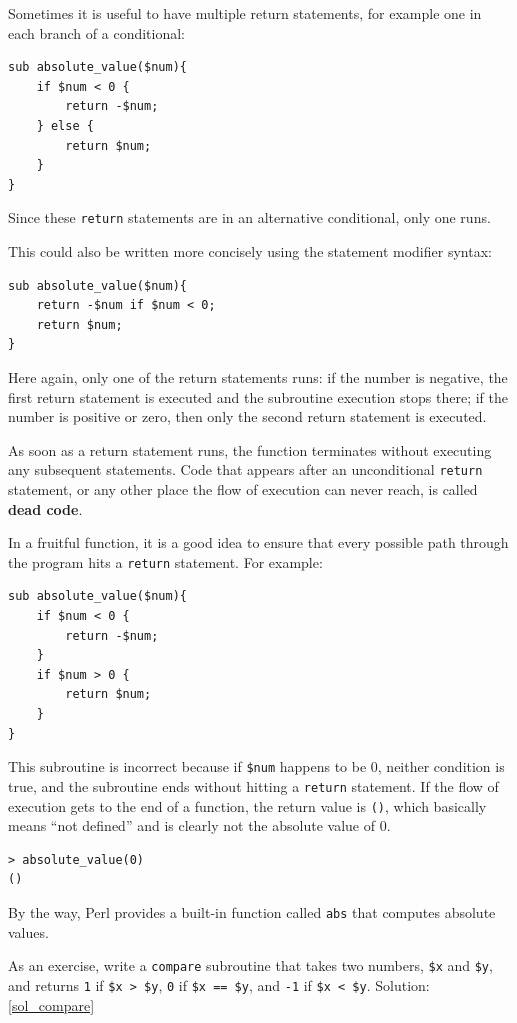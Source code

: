 Sometimes it is useful to have multiple return statements, for 
example one in each branch of a conditional:

\begin{verbatim}
sub absolute_value($num){
    if $num < 0 {
        return -$num;
    } else {
        return $num;
    }
}
\end{verbatim}
%
Since these {\tt return} statements are in an alternative 
conditional, only one runs.

This could also be written more concisely using the statement 
modifier syntax:

\begin{verbatim}
sub absolute_value($num){
    return -$num if $num < 0;
    return $num;
}
\end{verbatim}
%
Here again, only one of the return statements runs: if the 
number is negative, the first return statement is executed and 
the subroutine execution stops there; if the number is 
positive or zero, then only the second return statement is 
executed. 

As soon as a return statement runs, the function
terminates without executing any subsequent statements.
Code that appears after an unconditional {\tt return} statement, 
or any other place the flow of execution can never reach, 
is called {\bf dead code}.

In a fruitful function, it is a good idea to ensure
that every possible path through the program hits a
{\tt return} statement.  For example:

\begin{verbatim}
sub absolute_value($num){
    if $num < 0 {
        return -$num;
    } 
    if $num > 0 {
        return $num;
    }
}
\end{verbatim}
%


This subroutine is incorrect because if {\tt \$num} happens to be 0,
neither condition is true, and the subroutine ends without hitting a
{\tt return} statement.  If the flow of execution gets to the end
of a function, the return value is {\tt ()}, which basically 
means ``not defined'' and is clearly not the absolute value of 0.

\begin{verbatim}
> absolute_value(0)
()
\end{verbatim}
%
By the way, Perl provides a built-in function called 
{\tt abs} that computes absolute values.

\label{compare}
As an exercise, write a {\tt compare} subroutine that 
takes two numbers, {\tt \$x} and {\tt \$y}, and returns {\tt 1} 
if {\tt \$x > \$y}, {\tt 0} if {\tt \$x == \$y}, and 
{\tt -1} if {\tt \$x < \$y}.
Solution: \ref{sol_compare}


